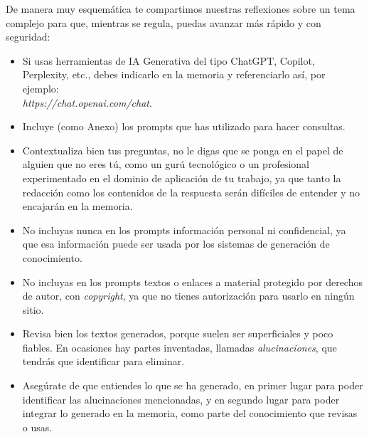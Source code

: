 De manera muy esquemática te compartimos nuestras reflexiones sobre un tema complejo para que, mientras se regula, puedas avanzar más rápido y con seguridad:

\begin{itemize}  %
    \item Si usas herramientas de IA Generativa del tipo ChatGPT, Copilot, Perplexity, etc., debes indicarlo en la memoria y referenciarlo así, por ejemplo:
    \textit{\\https://chat.openai.com/chat}.
    \item Incluye (como Anexo) los prompts que has utilizado para hacer consultas.
    \item Contextualiza bien tus preguntas, no le digas que se ponga en el papel de alguien que no eres tú, como un gurú tecnológico o un profesional experimentado en el dominio de aplicación de tu trabajo, ya que tanto la redacción como los contenidos de la respuesta serán difíciles de entender y no encajarán en la memoria.
    \item No incluyas nunca en los prompts información personal ni confidencial, ya que esa información puede ser usada por los sistemas de generación de conocimiento.
    \item No incluyas en los prompts textos o enlaces a material protegido por derechos de autor, con \textit{copyright}, ya que no tienes autorización para usarlo en ningún sitio.
    \item Revisa bien los textos generados, porque suelen ser superficiales y poco fiables. En ocasiones hay partes inventadas, llamadas \textit{alucinaciones}, que tendrás que identificar para eliminar.
    \item Asegúrate de que entiendes lo que se ha generado, en primer lugar para poder identificar las alucinaciones mencionadas, y en segundo lugar para poder integrar lo generado en la memoria, como parte del conocimiento que revisas o usas.
\end{itemize}



